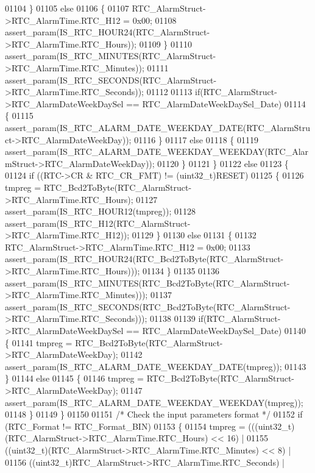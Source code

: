 \begin{DoxyCode}
01104     \}
01105     \textcolor{keywordflow}{else}
01106     \{
01107       RTC\_AlarmStruct->RTC\_AlarmTime.RTC\_H12 = 0x00;
01108       assert_param(IS\_RTC\_HOUR24(RTC\_AlarmStruct->RTC\_AlarmTime.RTC\_Hours));
01109     \}
01110     assert_param(IS\_RTC\_MINUTES(RTC\_AlarmStruct->RTC\_AlarmTime.RTC\_Minutes));
01111     assert_param(IS\_RTC\_SECONDS(RTC\_AlarmStruct->RTC\_AlarmTime.RTC\_Seconds));
01112 
01113     \textcolor{keywordflow}{if}(RTC\_AlarmStruct->RTC_AlarmDateWeekDaySel == 
      RTC_AlarmDateWeekDaySel_Date)
01114     \{
01115       assert_param(IS\_RTC\_ALARM\_DATE\_WEEKDAY\_DATE(RTC\_AlarmStruct->RTC\_AlarmDateWeekDay));
01116     \}
01117     \textcolor{keywordflow}{else}
01118     \{
01119       assert_param(IS\_RTC\_ALARM\_DATE\_WEEKDAY\_WEEKDAY(RTC\_AlarmStruct->RTC\_AlarmDateWeekDay));
01120     \}
01121   \}
01122   \textcolor{keywordflow}{else}
01123   \{
01124     \textcolor{keywordflow}{if} ((RTC->CR & RTC_CR_FMT) != (uint32\_t)RESET)
01125     \{
01126       tmpreg = RTC\_Bcd2ToByte(RTC\_AlarmStruct->RTC\_AlarmTime.RTC\_Hours);
01127       assert_param(IS\_RTC\_HOUR12(tmpreg));
01128       assert_param(IS\_RTC\_H12(RTC\_AlarmStruct->RTC\_AlarmTime.RTC\_H12));
01129     \}
01130     \textcolor{keywordflow}{else}
01131     \{
01132       RTC\_AlarmStruct->RTC\_AlarmTime.RTC\_H12 = 0x00;
01133       assert_param(IS\_RTC\_HOUR24(RTC\_Bcd2ToByte(RTC\_AlarmStruct->RTC\_AlarmTime.RTC\_Hours)));
01134     \}
01135 
01136     assert_param(IS\_RTC\_MINUTES(RTC\_Bcd2ToByte(RTC\_AlarmStruct->RTC\_AlarmTime.RTC\_Minutes)));
01137     assert_param(IS\_RTC\_SECONDS(RTC\_Bcd2ToByte(RTC\_AlarmStruct->RTC\_AlarmTime.RTC\_Seconds)));
01138 
01139     \textcolor{keywordflow}{if}(RTC\_AlarmStruct->RTC_AlarmDateWeekDaySel == 
      RTC_AlarmDateWeekDaySel_Date)
01140     \{
01141       tmpreg = RTC_Bcd2ToByte(RTC\_AlarmStruct->RTC_AlarmDateWeekDay);
01142       assert_param(IS\_RTC\_ALARM\_DATE\_WEEKDAY\_DATE(tmpreg));
01143     \}
01144     \textcolor{keywordflow}{else}
01145     \{
01146       tmpreg = RTC_Bcd2ToByte(RTC\_AlarmStruct->RTC_AlarmDateWeekDay);
01147       assert_param(IS\_RTC\_ALARM\_DATE\_WEEKDAY\_WEEKDAY(tmpreg));
01148     \}
01149   \}
01150 
01151   \textcolor{comment}{/* Check the input parameters format */}
01152   \textcolor{keywordflow}{if} (RTC\_Format != RTC_Format_BIN)
01153   \{
01154     tmpreg = (((uint32\_t)(RTC\_AlarmStruct->RTC_AlarmTime.RTC_Hours) << 16) |
01155               ((uint32\_t)(RTC\_AlarmStruct->RTC_AlarmTime.RTC_Minutes) << 8) |
01156               ((uint32\_t)RTC\_AlarmStruct->RTC_AlarmTime.RTC_Seconds) |

\end{DoxyCode}
